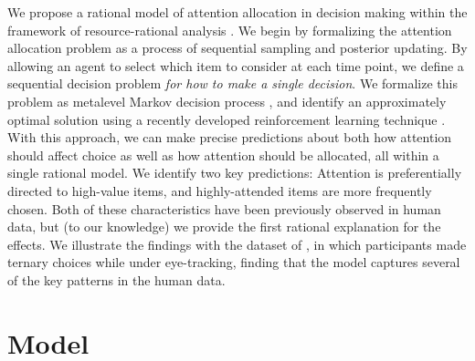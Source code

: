 \documentclass[11pt]{article} %
\begin{document}


We propose a rational model of attention allocation in decision making within the framework of resource-rational analysis \citep{griffiths15}. We begin by formalizing the attention allocation problem as a process of sequential sampling and posterior updating. By allowing an agent to select which item to consider at each time point, we define a sequential decision problem \emph{for how to make a single decision}. We formalize this problem as metalevel Markov decision process \citep{Hay2012}, and identify an approximately optimal solution using a recently developed reinforcement learning technique \citep{callaway2018learning}. With this approach, we can make precise predictions about both how attention should affect choice as well as how attention should be allocated, all within a single rational model. We identify two key predictions: Attention is preferentially directed to high-value items, and highly-attended items are more frequently chosen. Both of these characteristics have been previously observed in human data, but (to our knowledge) we provide the first rational explanation for the effects. We illustrate the findings with the dataset of \citet{Krajbich2011}, in which participants made ternary choices while under eye-tracking, finding that the model captures several of the key patterns in the human data.


\section{Model}
\end{document}
